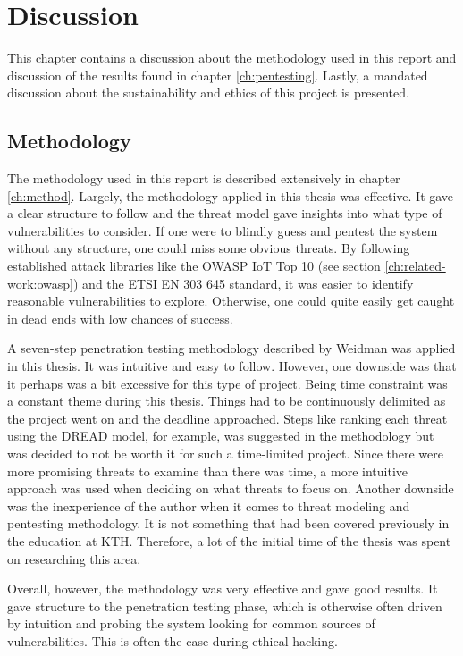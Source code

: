 \chapter{Discussion} \label{ch:discussion}
This chapter contains a discussion about the methodology used in this report and discussion of the results found in chapter \ref{ch:pentesting}. Lastly, a mandated discussion about the sustainability and ethics of this project is presented.

\section{Methodology}
The methodology used in this report is described extensively in chapter \ref{ch:method}. Largely, the methodology applied in this thesis was effective. It gave a clear structure to follow and the threat model gave insights into what type of vulnerabilities to consider. If one were to blindly guess and pentest the system without any structure, one could miss some obvious threats. By following established attack libraries like the OWASP IoT Top 10 \cite{owasp-iot-top10} (see section \ref{ch:related-work:owasp}) and the ETSI EN 303 645 standard, it was easier to identify reasonable vulnerabilities to explore. Otherwise, one could quite easily get caught in dead ends with low chances of success.

A seven-step penetration testing methodology described by Weidman \cite{weidman2014} was applied in this thesis. It was intuitive and easy to follow. However, one downside was that it perhaps was a bit excessive for this type of project. Being time constraint was a constant theme during this thesis. Things had to be continuously delimited as the project went on and the deadline approached. Steps like ranking each threat using the DREAD model, for example, was suggested in the methodology but was decided to not be worth it for such a time-limited project. Since there were more promising threats to examine than there was time, a more intuitive approach was used when deciding on what threats to focus on. Another downside was the inexperience of the author when it comes to threat modeling and pentesting methodology. It is not something that had been covered previously in the education at KTH. Therefore, a lot of the initial time of the thesis was spent on researching this area.

Overall, however, the methodology was very effective and gave good results. It gave structure to the penetration testing phase, which is otherwise often driven by intuition and probing the system looking for common sources of vulnerabilities. This is often the case during ethical hacking.

